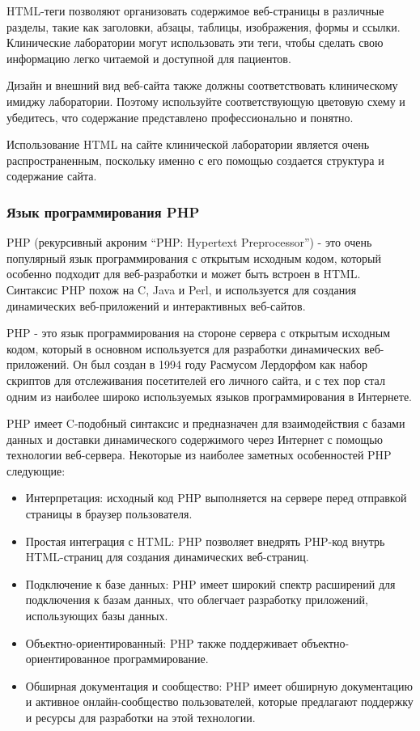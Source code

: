 HTML-теги позволяют организовать содержимое веб-страницы в различные разделы, такие как заголовки, абзацы, таблицы, изображения, формы и ссылки. Клинические лаборатории могут использовать эти теги, чтобы сделать свою информацию легко читаемой и доступной для пациентов.

Дизайн и внешний вид веб-сайта также должны соответствовать клиническому имиджу лаборатории. Поэтому используйте соответствующую цветовую схему и убедитесь, что содержание представлено профессионально и понятно.

Использование HTML на сайте клинической лаборатории является очень распространенным, поскольку именно с его помощью создается структура и содержание сайта.

\subsubsection{Язык программирования PHP}

PHP (рекурсивный акроним ``PHP: Hypertext Preprocessor'') - это очень популярный язык программирования с открытым исходным кодом, который особенно подходит для веб-разработки и может быть встроен в HTML. Синтаксис PHP похож на C, Java и Perl, и используется для создания динамических веб-приложений и интерактивных веб-сайтов.

PHP - это язык программирования на стороне сервера с открытым исходным кодом, который в основном используется для разработки динамических веб-приложений. Он был создан в 1994 году Расмусом Лердорфом как набор скриптов для отслеживания посетителей его личного сайта, и с тех пор стал одним из наиболее широко используемых языков программирования в Интернете.

PHP имеет C-подобный синтаксис и предназначен для взаимодействия с базами данных и доставки динамического содержимого через Интернет с помощью технологии веб-сервера. Некоторые из наиболее заметных особенностей PHP следующие:

\begin{itemize}
	\item  Интерпретация: исходный код PHP выполняется на сервере перед отправкой страницы в браузер пользователя.
	\item Простая интеграция с HTML: PHP позволяет внедрять PHP-код внутрь HTML-страниц для создания динамических веб-страниц.
	\item Подключение к базе данных: PHP имеет широкий спектр расширений для подключения к базам данных, что облегчает разработку приложений, использующих базы данных.
	\item Объектно-ориентированный: PHP также поддерживает объектно-ориентированное программирование.
	\item Обширная документация и сообщество: PHP имеет обширную документацию и активное онлайн-сообщество пользователей, которые предлагают поддержку и ресурсы для разработки на этой технологии.
\end{itemize}

